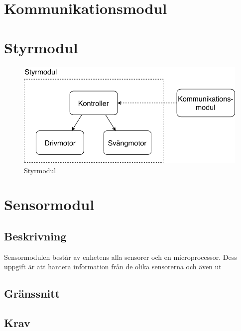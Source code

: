 \documentclass[kravspec/krav.tex]{subfiles}
\begin{document}
\section{Kommunikationsmodul}

\section{Styrmodul}
\begin{figure}[h]
    \centering
    \includegraphics[width=0.6\linewidth]{kravspec/figures/styrmodul.pdf}
    \caption{Styrmodul}
    \label{fig:styrmodul}
\end{figure}

\section{Sensormodul}
\subsection{Beskrivning}
Sensormodulen består av enhetens alla sensorer och en microprocessor. Dess
uppgift är att hantera information från de olika sensorerna och även
ut
\subsection{Gränssnitt}
\subsection{Krav}
\end{document}
